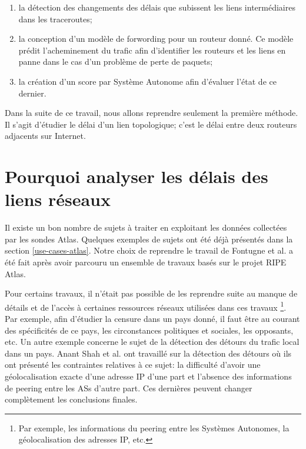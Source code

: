 \begin{enumerate}
	\item la détection des changements des délais que subissent les liens intermédiaires dans les traceroutes; 
	
	\item la conception d'un modèle de forwording pour un routeur donné. Ce modèle  prédit l'acheminement du trafic afin d'identifier les routeurs  et les liens en panne dans le cas  d'un problème  de perte de paquets;
	
	\item la création d'un score par Système Autonome afin d'évaluer l'état de ce dernier.
	
\end{enumerate}

Dans la suite de ce travail, nous allons reprendre seulement la première méthode.  Il s'agit d'étudier le délai d'un lien topologique; c'est le délai entre deux routeurs adjacents sur Internet.



\section{Pourquoi analyser les délais des liens réseaux}

Il existe un bon nombre de sujets à traiter en exploitant les données collectées par les sondes Atlas. Quelques exemples de sujets ont été déjà présentés dans la section \ref{use-cases-atlas}. Notre choix de reprendre le travail de Fontugne et al. a été fait après avoir parcouru un ensemble de travaux basés sur le projet  RIPE Atlas. 

Pour certains travaux, il n'était pas possible  de les reprendre suite au manque de détails et de l'accès à  certaines ressources réseaux utilisées dans ces travaux \footnote{Par exemple, les informations du peering entre les Systèmes Autonomes, la géolocalisation des adresses IP, etc.}. Par exemple, afin d'étudier la censure dans un pays donné, il faut être au courant des spécificités de ce pays, les circonstances politiques et sociales, les opposants,  etc.  Un autre exemple concerne le sujet de la détection des détours du trafic local dans un pays.  Anant Shah  et al. ont travaillé sur la détection des détours \cite{anant-shah} où ils ont présenté  les contraintes relatives à ce sujet: la difficulté d'avoir une géolocalisation exacte d'une adresse IP d'une part et l'absence des informations de peering entre les ASs d'autre part. Ces dernières peuvent changer complètement les conclusions finales. 

